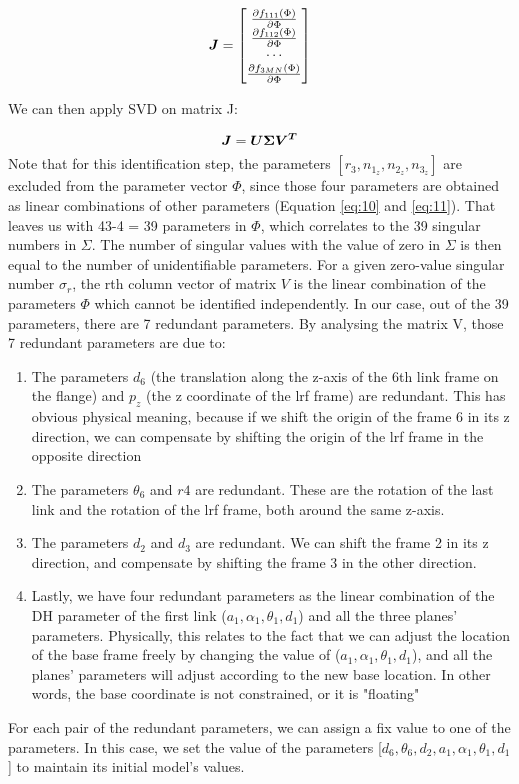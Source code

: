 \renewcommand\arraystretch{1.5}
\begin{equation}
\vb*{J} = \begin{bmatrix}
 \frac{\partial f_{111}(\Phi)}{\partial\Phi}\\
 \frac{\partial f_{112}(\Phi)}{\partial\Phi}\\
 \cdots \\
 \frac{\partial f_{3MN}(\Phi)}{\partial\Phi}\\
	\end{bmatrix}
\end{equation}

We can then apply SVD on matrix J:

\begin{equation}
 \vb*{J} = \vb*{U}\vb*{\Sigma}\vb*{V^T}
\end{equation}
Note that for this identification step, the parameters $[r_3, n_{1_z}, n_{2_z}, n_{3_z}]$ are excluded from the parameter vector $\Phi$, since those four parameters are obtained as linear combinations of other parameters (Equation \eqref{eq:10} and \eqref{eq:11}). That leaves us with 43-4 = 39 parameters in $\Phi$, which correlates to the 39 singular numbers in $\Sigma$. The number of singular values with the value of zero in $\Sigma$ is then equal to the number of unidentifiable parameters. For a given zero-value singular number $\sigma_r$, the rth column vector of matrix $V$ is the linear combination of the parameters $\Phi$ which cannot be identified independently. 
In our case, out of the 39 parameters, there are 7 redundant parameters. By analysing the matrix V, those 7 redundant parameters are due to:
\begin{enumerate}
\item The parameters $d_6$ (the translation along the z-axis of the 6th link frame on the flange) and $p_z$ (the z coordinate of the \ac{lrf} frame) are redundant. This has obvious physical meaning, because if we shift the origin of the frame 6 in its z direction, we can compensate by shifting the origin of the \ac{lrf} frame in the opposite direction
\item The parameters $\theta_6$ and $r4$ are redundant. These are the rotation of the last link and the rotation of the \ac{lrf} frame, both around the same z-axis. 
\item The parameters $d_2$ and $d_3$ are redundant. We can shift the frame 2 in its z direction, and compensate by shifting the frame 3 in the other direction. 
\item Lastly, we have four redundant parameters as the linear combination of the DH parameter of the first link ($a_1, \alpha_1, \theta_1, d_1$) and all the three planes' parameters. Physically, this relates to the fact that we can adjust the location of the base frame freely by changing the value of ($a_1, \alpha_1, \theta_1, d_1$), and all the planes' parameters will adjust according to the new base location. In other words, the base coordinate is not constrained, or it is "floating"
\end{enumerate}

For each pair of the redundant parameters, we can assign a fix value to one of the parameters. In this case, we set the value of the parameters [$d_6, \theta_6, d_2, a_1, \alpha_1, \theta_1, d_1$] to maintain its initial model's values. 
